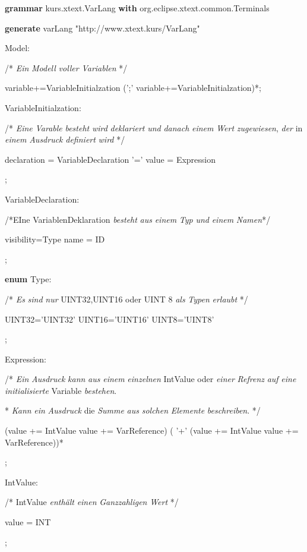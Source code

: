 \documentclass[a4]{article}
\begin{document}
\textbf{grammar}
kurs.xtext.VarLang \textbf{with} org.eclipse.xtext.common.Terminals

\textbf{generate} varLang "http://www.xtext.kurs/VarLang"

Model:

/* \emph{Ein} \emph{Modell} \emph{voller} \emph{Variablen} */

variable+=VariableInitialzation (';' variable+=VariableInitialzation)*;

VariableInitialzation:

/* \emph{Eine} \emph{Varable} \emph{besteht} \emph{wird}
\emph{deklariert} \emph{und} \emph{danach} \emph{einem} \emph{Wert}
\emph{zugewiesen}, \emph{der} in \emph{einem} \emph{Ausdruck}
\emph{definiert} \emph{wird} */

declaration = VariableDeclaration '=' value = Expression

;

VariableDeclaration:

/*EIne VariablenDeklaration \emph{besteht} \emph{aus} \emph{einem}
\emph{Typ} \emph{und} \emph{einem} \emph{Namen}*/

visibility=Type name = ID

;

\textbf{enum} Type:

/* \emph{Es} \emph{sind} \emph{nur} UINT32,UINT16 oder UINT 8 \emph{als}
\emph{Typen} \emph{erlaubt} */

UINT32='UINT32' \textbar{} UINT16='UINT16' \textbar{} UINT8='UINT8'

;

Expression:

/* \emph{Ein} \emph{Ausdruck} \emph{kann} \emph{aus} \emph{einem}
\emph{einzelnen} IntValue oder \emph{einer} \emph{Refrenz} \emph{auf}
\emph{eine} \emph{initialisierte} Variable \emph{bestehen}.

* \emph{Kann} \emph{ein} \emph{Ausdruck} die \emph{Summe} \emph{aus}
\emph{solchen} \emph{Elemente} \emph{beschreiben}. */

(value += IntValue \textbar{} value += VarReference) ( '+' (value +=
IntValue \textbar{} value += VarReference))*

;

IntValue:

/* IntValue \emph{enthält} \emph{einen} \emph{Ganzzahligen} \emph{Wert}
*/

value = INT

;
\end{document}
